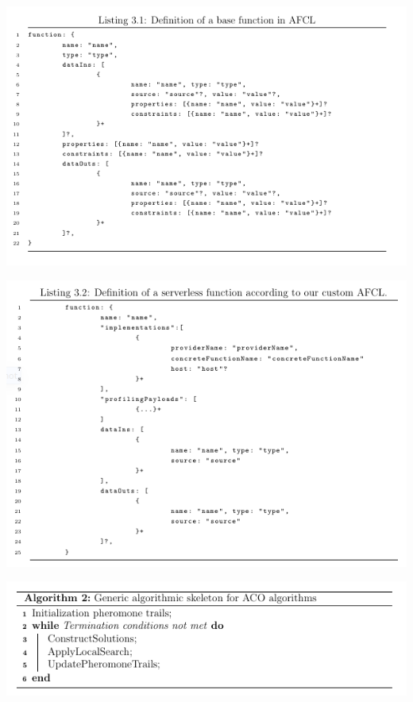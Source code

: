 \documentclass[13.5pt]{beamer}
\begin{document}
\begin{frame}[noframenumbering]
	
	\begin{center}
		\includegraphics[width=\textwidth,height=0.80\textheight]{../Images/super5.png}
	\end{center}
	
\end{frame} 

\begin{frame}[noframenumbering]
	
	\begin{center}
		\includegraphics[width=\textwidth,height=0.80\textheight]{../Images/super6.png}
	\end{center}
	
\end{frame} 

\begin{frame}[noframenumbering]
	
	\begin{center}
		\includegraphics[width=\textwidth,height=0.5\textheight]{../Images/super7.png}
	\end{center}
	
\end{frame} 
\end{document}
